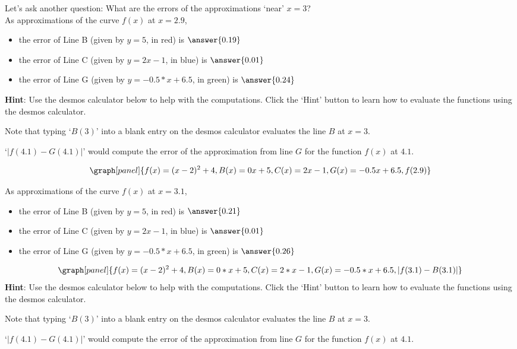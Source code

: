 \documentclass[handout,nooutcomes]{ximera}
\begin{document}
\begin{question}
Let's ask another question: What are the errors of the approximations `near' $x=3$? \\

As approximations of the curve $f(x)$ at {\bf $x=2.9$},
\begin{itemize}
\item the error of Line B (given by $y=5$, in red) is $\answer{0.19}$
\item the error of Line C (given by $y=2x-1$, in blue) is $\answer{0.01}$
\item the error of Line G (given by $y=-0.5*x + 6.5$, in green) is $\answer{0.24}$
\end{itemize}

{\bf Hint}: Use the desmos calculator below to help with the computations.
Click the `Hint' button to learn how to evaluate the functions using
the desmos calculator.\\
\begin{hint}
Note that typing `$B(3)$' into a blank entry on the desmos calculator
evaluates the line $B$ at $x=3$.
\end{hint}
\begin{hint}
`$|f(4.1) - G(4.1)|$' would compute the error of the approximation
from line $G$ for the function $f(x)$ at $4.1$.
\end{hint}
\[
\graph[panel]{f(x) = (x - 2)^2 + 4, B(x) = 0x + 5, C(x) = 2x -1, G(x) = -0.5x + 6.5, f(2.9)}
\]


As approximations of the curve $f(x)$ at {\bf $x=3.1$},\\
\begin{itemize}
\item the error of Line B (given by $y=5$, in red) is $\answer{0.21}$\\
\item the error of Line C (given by $y=2x-1$, in blue) is $\answer{0.01}$\\
\item the error of Line G (given by $y=-0.5*x + 6.5$, in green) is $\answer{0.26}$\\
\end{itemize}
\[
\graph[panel]{f(x) = (x-2)^2 + 4, B(x) = 0*x + 5, C(x) = 2*x -1, G(x) = -0.5*x + 6.5, |f(3.1) - B(3.1)|}
\]
{\bf Hint}: Use the desmos calculator below to help with the computations.
Click the `Hint' button to learn how to evaluate the functions using
the desmos calculator.\\
\begin{hint}
Note that typing `$B(3)$' into a blank entry on the desmos calculator
evaluates the line $B$ at $x=3$.
\end{hint}
\begin{hint}
`$|f(4.1) - G(4.1)|$' would compute the error of the approximation
from line $G$ for the function $f(x)$ at $4.1$.
\end{hint}
\end{question}
\end{document}
